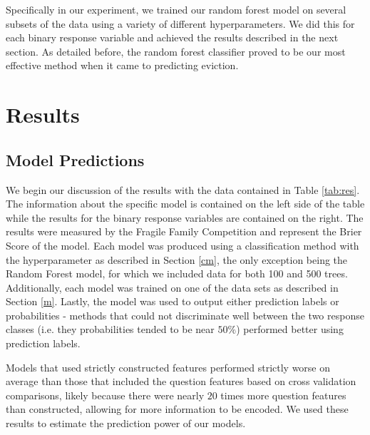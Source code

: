 \documentclass{article} %
\begin{document}
Specifically in our experiment, we trained our random forest model on several subsets of the data using a variety of different hyperparameters. We did this for each binary response variable and achieved the results described in the next section. As detailed before, the random forest classifier proved to be our most effective method when it came to predicting eviction.

\section{Results}

\subsection{Model Predictions}

We begin our discussion of the results with the data contained in Table \ref{tab:res}. The information about the specific model is contained on the left side of the table while the results for the binary response variables are contained on the right. The results were measured by the Fragile Family Competition and represent the Brier Score of the model. Each model was produced using a classification method with the hyperparameter as described in Section \ref{cm}, the only exception being the Random Forest model, for which we included data for both 100 and 500 trees. Additionally, each model was trained on one of the data sets as described in Section \ref{m}. Lastly, the model was used to output either prediction labels or probabilities - methods that could not discriminate well between the two response classes (i.e. they probabilities tended to be near $50\%$) performed better using prediction labels.

Models that used strictly constructed features performed strictly worse on average than those that included the question features based on cross validation comparisons, likely because there were nearly $20$ times more question features than constructed, allowing for more information to be encoded. We used these results to estimate the prediction power of our models.
\end{document}
